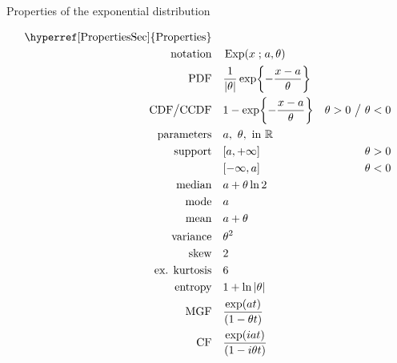 

\begin{table*}[t!]
\caption[Exponential distribution -- Properties]{Properties of the exponential distribution}
\begin{align*}
\text{\hyperref[PropertiesSec]{Properties}}  \quad& \\
\text{notation} \quad & \op{Exp}(x\given a,\theta)					\checked
\\
\text{PDF}\quad &    \frac{1}{|\theta|} \exp\Left\{-\frac{x-a}{\theta}\Right\} 	\checked
\\
\text{CDF}\big  / \text{CCDF}  \quad  &   1- \exp\Left\{-\frac{x-a}{\theta}\Right\} & \theta>0 \ \big{/} \  \theta<0
\checked
\\
\text{parameters}\quad &   a,\ \theta, \text{ in } \Real 				\checked
\\
\text{support} \quad &   [ a, +\infty]      & \theta>0					\checked
\\
				&   [-\infty,  a]     & \theta <0					\checked
\\
\text{median} \quad  &  a + \theta \ln 2							\checked
\\
\text{mode} \quad  & a										\checked
\\
\text{mean} \quad  &  a+ \theta									\checked						
\\
\text{variance} \quad  & \theta^2								\checked
\\
\text{skew} \quad  &  2										\checked
\\
\text{ex. kurtosis} \quad  &  6										\checked
\\
\text{entropy} \quad  & 1 + \ln |\theta|							\checked
\\
\text{MGF} \quad  & \frac{\exp(at) }{ \Left(1- \theta t\Right)}				\checked
\\
\text{CF} \quad  & \frac{\exp(iat) }{ \Left(1- i \theta t\Right)}				\checked
\end{align*}
\end{table*}
